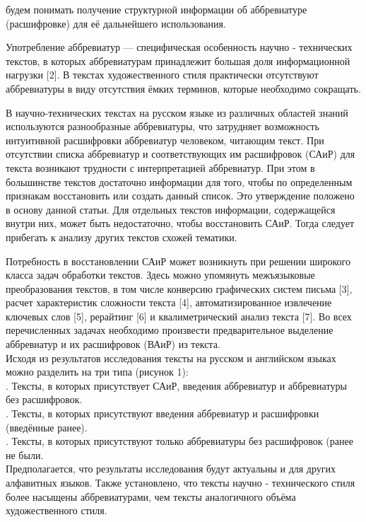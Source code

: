 \documentclass[12pt]{article}
\begin{document}
\noindent будем понимать получение структурной информации об аббревиатуре (расшифровке) для её дальнейшего использования.

\indent Употребление аббревиатур — специфическая особенность научно - технических текстов, в которых аббревиатурам принадлежит большая доля информационной нагрузки [2]. В текстах художественного стиля практически отсутствуют аббревиатуры в виду отсутствия ёмких терминов, которые необходимо сокращать.

\indent В научно-технических текстах на русском языке из различных областей знаний используются разнообразные аббревиатуры, что затрудняет возможность интуитивной расшифровки аббревиатур человеком, читающим текст. При отсутствии списка аббревиатур и соответствующих им расшифровок (САиР) для текста возникают трудности с интерпретацией аббревиатур. При этом в большинстве текстов достаточно информации для того, чтобы по определенным признакам восстановить или создать данный список. Это утверждение положено в основу данной статьи. Для отдельных текстов информации, содержащейся внутри них, может быть недостаточно, чтобы восстановить САиР. Тогда следует прибегать к анализу других текстов схожей тематики.

\indent Потребность в восстановлении САиР может возникнуть при решении широкого класса задач обработки текстов. Здесь можно упомянуть межъязыковые преобразования текстов, в том числе конверсию графических систем письма [3], расчет характеристик сложности текста [4], автоматизированное извлечение ключевых слов [5], рерайтинг [6] и квалиметрический анализ текста [7]. Во всех перечисленных задачах необходимо произвести предварительное выделение аббревиатур и их расшифровок (ВАиР) из текста. \\

\indent Исходя из результатов исследования тексты на русском и английском языках можно разделить на три типа (рисунок 1): \\
. Тексты, в которых присутствует САиР, введения аббревиатур и аббревиатуры без расшифровок. \\
. Тексты, в которых присутствуют введения аббревиатур и расшифровки (введённые ранее). \\
. Тексты, в которых присутствуют только аббревиатуры без расшифровок (ранее не были. \\

\indent Предполагается, что результаты исследования будут актуальны и для других алфавитных языков. Также установлено, что тексты научно - технического стиля более насыщены аббревиатурами, чем тексты аналогичного объёма художественного стиля.
\end{document}
